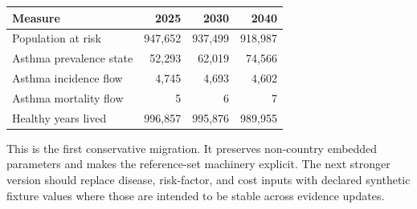 \documentclass[11pt]{article}
\newcommand{\sectiontitle}[1]{\vspace{9pt}{\large\bfseries #1}\par\vspace{-2pt}}
\begin{document}
\sectiontitle{Headline outputs}
\begin{tabularx}{\textwidth}{@{}p{2.85in}rrr@{}}
\toprule
\textbf{Measure} & \textbf{2025} & \textbf{2030} & \textbf{2040}\\
\midrule
Population at risk & 947,652 & 937,499 & 918,987\\
Asthma prevalence state & 52,293 & 62,019 & 74,566\\
Asthma incidence flow & 4,745 & 4,693 & 4,602\\
Asthma mortality flow & 5 & 6 & 7\\
Healthy years lived & 996,857 & 995,876 & 989,955\\
\bottomrule
\end{tabularx}

\sectiontitle{Limits}
This is the first conservative migration. It preserves non-country embedded parameters and makes the reference-set machinery explicit. The next stronger version should replace disease, risk-factor, and cost inputs with declared synthetic fixture values where those are intended to be stable across evidence updates.
\end{document}
